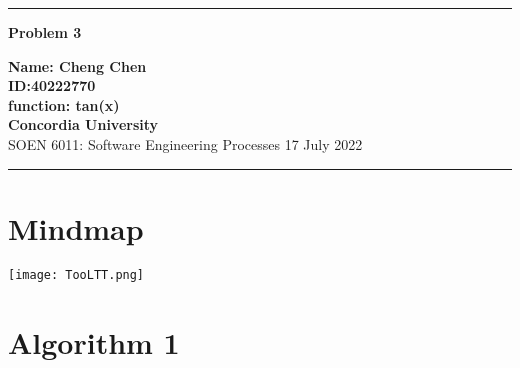 \documentclass[10pt,a4paper,twoside]{article}
\begin{document}
\begin{center}
\hrule

\vspace{.4cm}
{\bf {\Huge Problem 3}}
\vspace{.2cm}
\end{center}
{\bf Name: Cheng Chen}  \\
{\bf ID:40222770}\\
{\bf function: tan(x)}\\
{\bf Concordia University}\\
SOEN 6011: Software Engineering Processes {\bf  } \hspace{\fill}  17 July  2022 \\
\hrule






\section{Mindmap}
\texttt{[image: TooLTT.png]}

\section{Algorithm 1}
\end{document}
